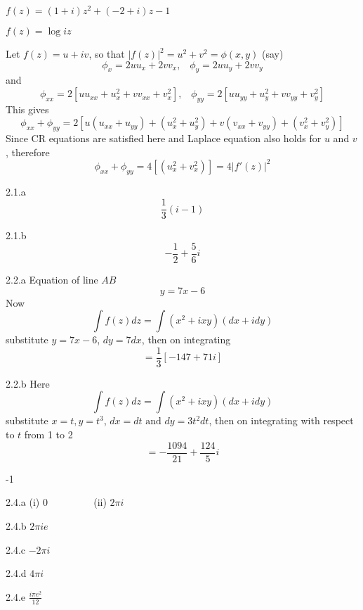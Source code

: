 \begin{Solution}{1.20}
$f(z)=(1+i)z^2 + (-2+i)z-1$
\end{Solution}
\begin{Solution}{1.21}
$f(z)=\log iz$
\end{Solution}
\begin{Solution}{1.22}
Let $f(z)=u+iv$, so that $|f(z)|^2=u^2+v^2 = \phi(x,y)$ (say)
\[\phi_x = 2uu_x + 2vv_x,\;\;\;\phi_y = 2uu_y + 2vv_y\]
and
\[\phi_{xx} = 2\left[uu_{xx} + u_x^2 + vv_{xx} + v_x^2\right],\;\;\;\phi_{yy} =  2\left[uu_{yy} + u_y^2 + vv_{yy} + v_y^2\right]\]
This gives
\[\phi_{xx} + \phi_{yy} =  2\left[u(u_{xx}+u_{yy}) + (u_x^2 + u_y^2) + v(v_{xx}+v_{yy}) + (v_x^2+v_y^2)\right] \]
Since CR equations are satisfied here and Laplace equation also holds for $u$ and $v$, therefore
\[\phi_{xx} + \phi_{yy} =  4\left[(u_x^2 + v_x^2) \right]  = 4 |f'(z)|^2\]
\end{Solution}
\begin{Solution}{2.1.a}
\[\frac{1}{3}(i-1)\]
\end{Solution}
\begin{Solution}{2.1.b}
\[-\frac{1}{2}+\frac{5}{6}i\]
\end{Solution}
\begin{Solution}{2.2.a}
Equation of line $AB$
\[y=7x-6\]
Now
\[\int f(z) dz  = \int (x^2 + ixy)(dx+idy)\]
substitute $y=7x-6$, $dy=7dx$, then on integrating
\[=\frac{1}{3}[-147+71i]\]
\end{Solution}
\begin{Solution}{2.2.b}
Here
\[\int f(z) dz  = \int (x^2 + ixy)(dx+idy)\]
substitute $x=t,y=t^3$, $dx=dt\text{ and } dy=3t^2dt$, then on integrating with respect to $t$ from 1 to 2
\[=-\frac{1094}{21}+\frac{124}{5}i\]
\end{Solution}
\begin{Solution}{2.3}
-1
\end{Solution}
\begin{Solution}{2.4.a}
(i) 0	~~~~~~~~ (ii) $2\pi i$
\end{Solution}
\begin{Solution}{2.4.b}
$2\pi i e$
\end{Solution}
\begin{Solution}{2.4.c}
$-2\pi i$
\end{Solution}
\begin{Solution}{2.4.d}
$4\pi i $
\end{Solution}
\begin{Solution}{2.4.e}
$\frac{i\pi e^2}{12}$
\end{Solution}
